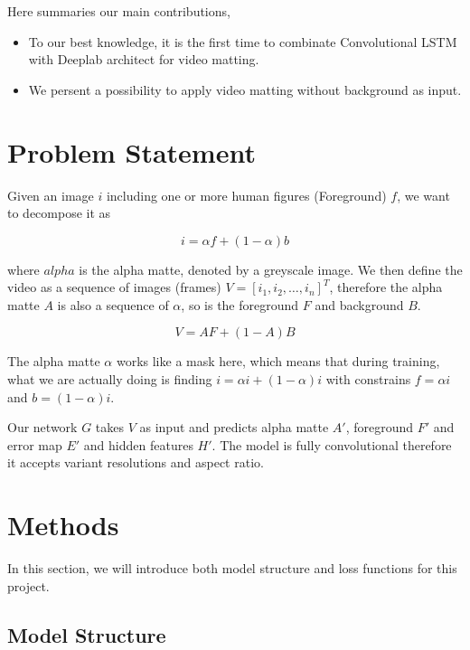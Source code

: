 \documentclass[final]{cvpr}
\begin{document}
Here summaries our main contributions,

\begin{itemize}
    \item To our best knowledge, it is the first time to combinate Convolutional LSTM with Deeplab architect for video matting.
    \item We persent a possibility to apply video matting without background as input.
\end{itemize}

\section{Problem Statement}

Given an image $i$ including one or more human figures (Foreground) $f$, we want to decompose it as

\begin{equation}\label{formulationImage}
    i=\alpha f+(1-\alpha)b
\end{equation}

where $alpha$ is the alpha matte, denoted by a greyscale image.
We then define the video as a sequence of images (frames) $V=[i_1, i_2, \dots, i_n]^T$, therefore the alpha matte $A$ is also a sequence of $\alpha$, so is the foreground $F$ and background $B$.

\begin{equation}\label{formulationVideo}
    V=AF+(1-A)B
\end{equation}

The alpha matte $\alpha$ works like a mask here, which means that during training, what we are actually doing is finding $i=\alpha i+(1-\alpha)i$ with constrains $f=\alpha i$ and $b=(1-\alpha)i$.

Our network $G$ takes $V$ as input and predicts alpha matte $A'$, foreground $F'$ and error map $E'$ and hidden features $H'$.
The model is fully convolutional therefore it accepts variant resolutions and aspect ratio.

\section{Methods}

In this section, we will introduce both model structure and loss functions for this project.

\subsection{Model Structure}
\end{document}
